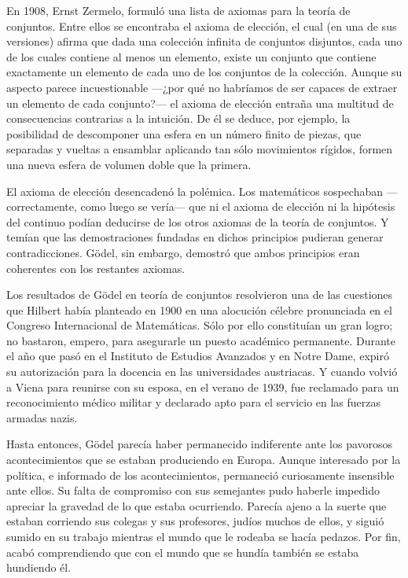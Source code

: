 \documentclass[a4paper, 12pt]{article}
\begin{document}
En 1908, Ernst Zermelo, formuló una lista de axiomas para la teoría de conjuntos. Entre ellos se encontraba el axioma de elección, el cual (en una de sus versiones) afirma que dada una colección infinita de conjuntos disjuntos, cada uno de los cuales contiene al menos un elemento, existe un conjunto que contiene exactamente un elemento de cada uno de los conjuntos de la colección. Aunque su aspecto parece incuestionable ---¿por qué no habríamos de ser capaces de extraer un elemento de cada conjunto?--- el axioma de elección entraña una multitud de consecuencias contrarias a la intuición. De él se deduce, por ejemplo, la posibilidad de descomponer una esfera en un número finito de piezas, que separadas y vueltas a ensamblar aplicando tan sólo movimientos rígidos, formen una nueva esfera de volumen doble que la primera.

El axioma de elección desencadenó la polémica. Los matemáticos sospechaban ---correctamente, como luego se vería--- que ni el axioma de elección ni la hipótesis del continuo podían deducirse de los otros axiomas de la teoría de conjuntos. Y temían que las demostraciones fundadas en dichos principios pudieran generar contradicciones. Gödel, sin embargo, demostró que ambos principios eran coherentes con los restantes axiomas.

Los resultados de Gödel en teoría de conjuntos resolvieron una de las cuestiones que Hilbert había planteado en 1900 en una alocución célebre pronunciada en el Congreso Internacional de Matemáticas. Sólo por ello constituían un gran logro; no bastaron, empero, para asegurarle un puesto académico permanente. Durante el año que pasó en el Instituto de Estudios Avanzados y en Notre Dame, expiró su autorización para la docencia en las universidades austriacas. Y cuando volvió a Viena para reunirse con su esposa, en el verano de 1939, fue reclamado para un reconocimiento médico militar y declarado apto para el servicio en las fuerzas armadas nazis.

Hasta entonces, Gödel parecía haber permanecido indiferente ante los pavorosos acontecimientos que se estaban produciendo en Europa. Aunque interesado por la política, e informado de los acontecimientos, permaneció curiosamente insensible ante ellos. Su falta de compromiso con sus semejantes pudo haberle impedido apreciar la gravedad de lo que estaba ocurriendo. Parecía ajeno a la suerte que estaban corriendo sus colegas y sus profesores, judíos muchos de ellos, y siguió sumido en su trabajo mientras el mundo que le rodeaba se hacía pedazos. Por fin, acabó comprendiendo que con el mundo que se hundía también se estaba hundiendo él.
\end{document}
